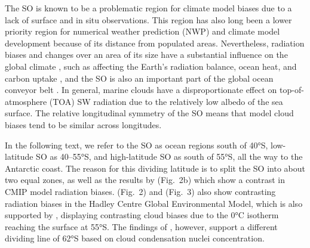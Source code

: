 \documentclass[draft]{agujournal2019}
\begin{document}
The SO is known to be a problematic region for climate model biases \cite{schuddeboom2021,hyder2018,cesana2022,zhao2022} due to a lack of surface and in situ observations. This region has also long been a lower priority region for numerical weather prediction (NWP) and climate model development because of its distance from populated areas. Nevertheless, radiation biases and changes over an area of its size have a substantial influence on the global climate \cite{rintoul2011,bodas-salcedo2012}, such as affecting the Earth's radiation balance, ocean heat, and carbon uptake \cite{williams2023}, and the SO is also an important part of the global ocean conveyor belt \cite{wang2014b}. In general, marine clouds have a disproportionate effect on top-of-atmosphere (TOA) SW radiation due to the relatively low albedo of the sea surface. The relative longitudinal symmetry of the SO means that model cloud biases tend to be similar across longitudes.

In the following text, we refer to the SO as ocean regions south of 40°S, low-latitude SO as 40--55°S, and high-latitude SO as south of 55°S, all the way to the Antarctic coast. The reason for this dividing latitude is to split the SO into about two equal zones, as well as the results by  (Fig.~2b) which show a contrast in CMIP model radiation biases.  (Fig.~2) and  (Fig.~3) also show contrasting radiation biases in the Hadley Centre Global Environmental Model, which is also supported by , displaying contrasting cloud biases due to the 0°C isotherm reaching the surface at 55°S. The findings of , however, support a different dividing line of 62°S based on cloud condensation nuclei concentration.
\end{document}
